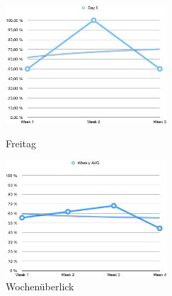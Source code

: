 \begin{figure}[t!]
    \centering
    \parbox{6cm}{
    \includegraphics[width=6cm]{./Abbildungen/Kapitel_04/usr2day5.png}
    \caption{Freitag}
    \label{usr2day5}}
    \qquad
    \begin{minipage}{6cm}
    \includegraphics[width=6cm]{./Abbildungen/Kapitel_04/usr2wa.png}
    \caption{Wochenüberlick}
    \label{usr2wa}
    \end{minipage}
\end{figure}
